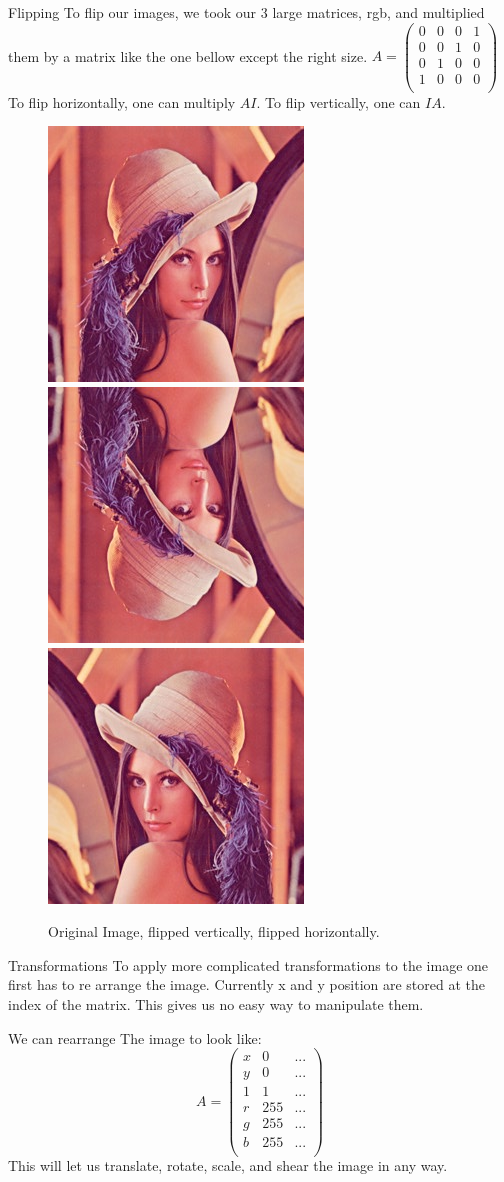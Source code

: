 \documentclass{beamer}
\begin{document}
\begin{frame}{Flipping}
To flip our images, we took our 3 large matrices, rgb, and multiplied them by a matrix like the one bellow except the right size.
$A = \begin{pmatrix}
	0 & 0 & 0 & 1\\
	0 & 0 & 1 & 0\\
	0 & 1 & 0 & 0\\
	1 & 0 & 0 & 0\\
\end{pmatrix}$
To flip horizontally, one can multiply $AI$. To flip vertically, one can $IA$.

\begin{figure}
\includegraphics[width = 0.9 in]{lennastory.jpg}
\hspace{0.5 in}
\includegraphics[width = 0.9 in]{lenna1.png}
\hspace{0.5 in}
\includegraphics[width = 0.9 in]{lenna2.png}
\caption{Original Image, flipped vertically, flipped horizontally.}
\end{figure}


\end{frame}


\begin{frame}{Transformations}
To apply more complicated transformations to the image one first has to re arrange the image. Currently x and y position are stored at the index of the matrix. This gives us no easy way to manipulate them.

We can rearrange The image to look like:
$$A = \begin{pmatrix}
	x & 0 & ...\\
	y & 0 & ...\\
	1 & 1 & ...\\
	r &  255 & ...\\
	g & 255 & ...\\
	b & 255 & ...\\
\end{pmatrix}$$
This will let us translate, rotate, scale, and shear the image in any way.

\end{frame}
\end{document}
